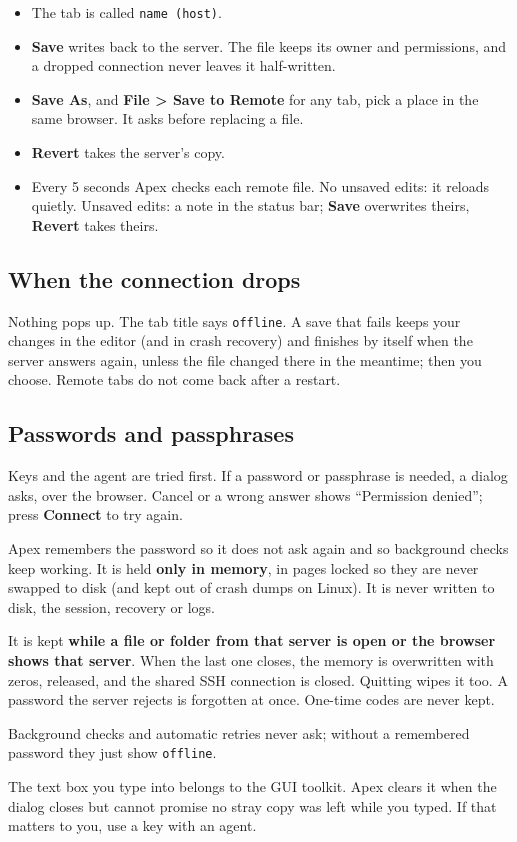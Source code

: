 \documentclass[11pt,a4paper,oneside]{report}
\newcommand{\menu}[1]{\textbf{#1}}
\begin{document}
\begin{itemize}
\item The tab is called \texttt{name (host)}.
\item \textbf{Save} writes back to the server. The file keeps its owner and
  permissions, and a dropped connection never leaves it half-written.
\item \textbf{Save As}, and \menu{File > Save to Remote} for any tab, pick
  a place in the same browser. It asks before replacing a file.
\item \textbf{Revert} takes the server's copy.
\item Every 5 seconds Apex checks each remote file. No unsaved edits: it
  reloads quietly. Unsaved edits: a note in the status bar; \textbf{Save}
  overwrites theirs, \textbf{Revert} takes theirs.
\end{itemize}

\subsection*{When the connection drops}

Nothing pops up. The tab title says \texttt{offline}. A save that fails
keeps your changes in the editor (and in crash recovery) and finishes by
itself when the server answers again, unless the file changed there in the
meantime; then you choose. Remote tabs do not come back after a restart.

\subsection*{Passwords and passphrases}

Keys and the agent are tried first. If a password or passphrase is needed,
a dialog asks, over the browser. Cancel or a wrong answer shows
``Permission denied''; press \textbf{Connect} to try again.

\begin{safenote}
Apex remembers the password so it does not ask again and so background
checks keep working. It is held \textbf{only in memory}, in pages locked so
they are never swapped to disk (and kept out of crash dumps on Linux). It is
never written to disk, the session, recovery or logs.

It is kept \textbf{while a file or folder from that server is open or the
browser shows that server}. When the last one closes, the memory is overwritten with
zeros, released, and the shared SSH connection is closed. Quitting wipes it
too. A password the server rejects is forgotten at once. One-time codes are
never kept.

Background checks and automatic retries never ask; without a remembered
password they just show \texttt{offline}.

The text box you type into belongs to the GUI toolkit. Apex clears it when
the dialog closes but cannot promise no stray copy was left while you typed.
If that matters to you, use a key with an agent.
\end{safenote}
\end{document}
